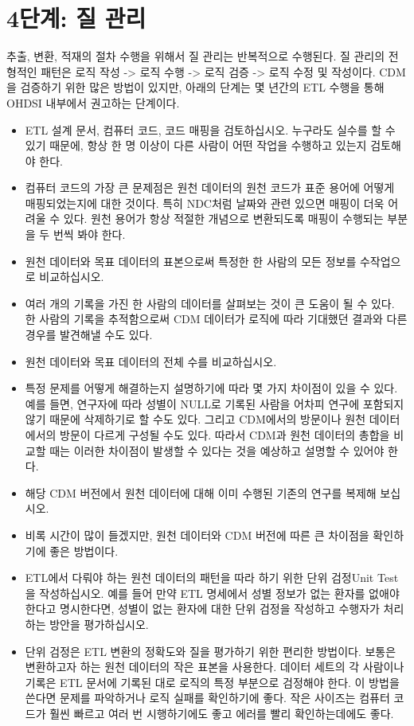 \documentclass[10.5pt]{book}
\providecommand{\tightlist}{%
  \setlength{\itemsep}{0pt}\setlength{\parskip}{0pt}}
\theoremstyle{definition}
\theoremstyle{definition}
\theoremstyle{definition}
\theoremstyle{remark}
\begin{document}
\section{4단계: 질 관리}\label{--}

추출, 변환, 적재의 절차 수행을 위해서 질 관리는 반복적으로 수행된다. 질
관리의 전형적인 패턴은 로직 작성 -\textgreater{} 로직 수행
-\textgreater{} 로직 검증 -\textgreater{} 로직 수정 및 작성이다. CDM을
검증하기 위한 많은 방법이 있지만, 아래의 단계는 몇 년간의 ETL 수행을
통해 OHDSI 내부에서 권고하는 단계이다. 

\begin{itemize}
\tightlist
\item
  ETL 설계 문서, 컴퓨터 코드, 코드 매핑을 검토하십시오. 누구라도 실수를
  할 수 있기 때문에, 항상 한 명 이상이 다른 사람이 어떤 작업을 수행하고
  있는지 검토해야 한다.
\item
  컴퓨터 코드의 가장 큰 문제점은 원천 데이터의 원천 코드가 표준 용어에
  어떻게 매핑되었는지에 대한 것이다. 특히 NDC처럼 날짜와 관련 있으면
  매핑이 더욱 어려울 수 있다. 원천 용어가 항상 적절한 개념으로
  변환되도록 매핑이 수행되는 부분을 두 번씩 봐야 한다.
\item
  원천 데이터와 목표 데이터의 표본으로써 특정한 한 사람의 모든 정보를
  수작업으로 비교하십시오.
\item
  여러 개의 기록을 가진 한 사람의 데이터를 살펴보는 것이 큰 도움이 될 수
  있다. 한 사람의 기록을 추적함으로써 CDM 데이터가 로직에 따라 기대했던
  결과와 다른 경우를 발견해낼 수도 있다.
\item
  원천 데이터와 목표 데이터의 전체 수를 비교하십시오.
\item
  특정 문제를 어떻게 해결하는지 설명하기에 따라 몇 가지 차이점이 있을 수
  있다. 예를 들면, 연구자에 따라 성별이 NULL로 기록된 사람을 어차피
  연구에 포함되지 않기 때문에 삭제하기로 할 수도 있다. 그리고 CDM에서의
  방문이나 원천 데이터에서의 방문이 다르게 구성될 수도 있다. 따라서
  CDM과 원천 데이터의 총합을 비교할 때는 이러한 차이점이 발생할 수
  있다는 것을 예상하고 설명할 수 있어야 한다.
\item
  해당 CDM 버전에서 원천 데이터에 대해 이미 수행된 기존의 연구를 복제해
  보십시오.
\item
  비록 시간이 많이 들겠지만, 원천 데이터와 CDM 버전에 따른 큰 차이점을
  확인하기에 좋은 방법이다.
\item
  ETL에서 다뤄야 하는 원천 데이터의 패턴을 따라 하기 위한 단위 검정Unit
  Test을 작성하십시오. 예를 들어 만약 ETL 명세에서 성별 정보가 없는
  환자를 없애야 한다고 명시한다면, 성별이 없는 환자에 대한 단위 검정을
  작성하고 수행자가 처리하는 방안을 평가하십시오.
\item
  단위 검정은 ETL 변환의 정확도와 질을 평가하기 위한 편리한 방법이다.
  보통은 변환하고자 하는 원천 데이터의 작은 표본을 사용한다. 데이터
  세트의 각 사람이나 기록은 ETL 문서에 기록된 대로 로직의 특정 부분으로
  검정해야 한다. 이 방법을 쓴다면 문제를 파악하거나 로직 실패를
  확인하기에 좋다. 작은 사이즈는 컴퓨터 코드가 훨씬 빠르고 여러 번
  시행하기에도 좋고 에러를 빨리 확인하는데에도 좋다.
\end{itemize}
\end{document}
